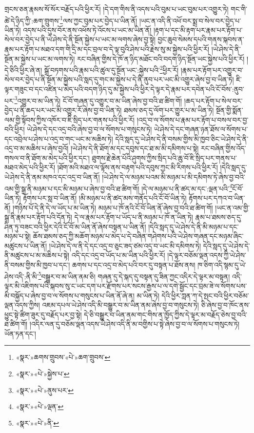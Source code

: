 གྲངས་ཅན་རྣམས་སོ་སོར་བརྗོད་པའི་ཕྱིར་རོ། །དེ་དག་གིས་ནི་འདས་པའི་བུམ་པ་ཡང་བུམ་པར་འགྱུར་ཏེ། གང་གི་ཚེ་དེ་ཉིད་ཀྱི་:ཆག་གྲུགས་\footnote{«སྣར་»ཆགས་གྲུབས་«པེ་»ཆག་གྲུབས་}ལས་ཀྱང་བུམ་པར་བྱེད་པ་ཡིན་ནོ། །ཡང་ན་འདི་ནི་འཕོ་བར་སྨྲ་བ་སེལ་བར་བྱེད་པ་ཡིན་ཏེ། འདས་པའི་དུས་བོར་ནས་འཕོས་ཏེ་འོངས་པ་ཡང་མ་ཡིན་ནོ། །རྟག་པ་དང་མི་རྟག་པར་རྣམ་པར་རྟོག་པ་སེལ་བར་བྱེད་པ་ནི་ཡེ་ཤེས་དེ་ནི་སྔོན་སྐྱེས་པ་ཡང་མ་ལགས་ཞེས་བྱ་སྟེ། བྱང་ཆུབ་སེམས་དཔའི་གནས་སྐབས་ན་རྣམ་པར་རྟོག་པ་མཐའ་དག་གི་དྲི་མ་དང་བྲལ་བ་དེ་ལྟ་བུའི་ཤེས་པའི་རྗེས་སུ་མ་སྐྱེས་པའི་ཕྱིར་རོ། །ཡེ་ཤེས་དེ་ནི་སྔོན་མ་སྐྱེས་པ་ཡང་མ་ལགས་ཏེ། རང་བཞིན་གྱིས་དེ་ཁོ་ན་ཉིད་མཐོང་བའི་བདག་ཉིད་སྔོན་ཡང་སྐྱེས་པའི་ཕྱིར་རོ། །དེ་ཅིའི་ཕྱིར་ཞེ་ན། སྒྲོ་བཏགས་པའི་རྣམ་པའི་ཚུལ་དུ་སྔོན་ཡང་:སྐྱེས་པའི་\footnote{«སྣར་»«པེ་»སྐྱེས་པ་}ཕྱིར་རོ། །རྣམ་པར་རྟོག་པར་འགྱུར་བ་སེལ་བར་བྱེད་པ་ནི་སྔོན་མ་སྐྱེས་པའི་སླད་དུ་གང་མ་སྐྱེས་པ་དེ་ནི་ནུབ་པར་ཡང་མི་འགྱུར་ཞེས་བྱ་བ་ཡིན་ཏེ། ཇི་ལྟར་གཟུང་བ་དང་འཛིན་པ་མེད་པའི་བདག་ཉིད་དུ་མ་སྐྱེས་པའི་ཕྱིར་དེ་ལྟར་དེ་རྣམ་པར་དབེན་པའི་ངོ་བོས་:ནུབ་པར་\footnote{«སྣར་»«པེ་»ནུས་པར་}འགྱུར་བ་མ་ཡིན་ཏེ། ངོ་བོ་གཞན་དུ་འགྱུར་བ་མ་ཡིན་ཞེས་བྱ་བའི་ཐ་ཚིག་གོ། །ཆད་པར་རྟོག་པ་སེལ་བར་བྱེད་པ་ནི་ཆད་པར་ཡང་མི་འགྱུར་རོ་ཞེས་བྱ་བ་ཡིན་ཏེ། ཐམས་ཅད་དུ་ལོག་པར་གྱུར་པ་མ་ཡིན་ཏེ། སྔོན་གྱི་སྨོན་ལམ་གྱི་སྟོབས་ཀྱིས་འཁོར་བ་ཇི་སྲིད་པར་གནས་པའི་ཕྱིར་རོ། །འདྲ་བ་ལ་སོགས་པ་རྣམ་པར་རྟོག་པ་བསལ་བར་བྱ་བའི་ཕྱིར། ཡེ་ཤེས་དེ་དང་འདྲ་བའི་ཞེས་བྱ་བ་ལ་སོགས་པ་གསུངས་ཏེ། ཡེ་ཤེས་དེ་དང་གཞན་ཉན་ཐོས་ལ་སོགས་པ་དང་འབྲེལ་པ་ཤེས་པ་འདྲ་བ་གང་ཡང་མ་མཆིས་ཏེ། དེའི་སླད་དུ་ཡེ་ཤེས་དེ་ནི་བསམ་གྱིས་མི་ཁྱབ་ཅིང་ཡེ་ཤེས་དེ་ནི་འདྲ་བ་མ་མཆིས་པ་ཞེས་བྱའོ། །ཡེ་ཤེས་དེ་ནི་ཐོག་མ་དང་དབུས་དང་ཐ་མ་མི་དམིགས་པ་སྟེ། རང་བཞིན་གྱིས་འོད་གསལ་བ་ནི་ཐོག་མ་མེད་པའི་ཕྱིར་དང་། ཐུགས་རྗེ་ཆེན་པོའི་ཤུགས་ཀྱིས་སྲིད་པའི་ཆུ་བོ་ཇི་སྲིད་པར་གནས་པ་མཐའ་མེད་པའི་ཕྱིར་རོ། །ཐོག་མའི་མཐའ་ལ་ལྟོས་ནས་བརྟག་པའི་དབུས་ཀྱང་མི་རིགས་པའི་ཕྱིར་རོ། །དེའི་སླད་དུ་ཡེ་ཤེས་དེ་ནི་ནམ་མཁའ་དང་འདྲ་བ་ཡིན་ནོ། །ཡེ་ཤེས་དེ་ལ་མཉམ་པའམ་མི་མཉམ་པ་མི་དམིགས་ཏེ་ཞེས་བྱ་བའི་འམ་གྱི་སྒྲ་ནི་མཉམ་པ་དང་མི་མཉམ་པ་ཞེས་བྱ་བའི་ཐ་ཚིག་གོ། །དེ་ལ་མཉམ་པ་ནི་ཚད་མ་དང་:ལྡན་པའི་\footnote{«སྣར་»«པེ་»ལྡན་}ངོ་བོ་ཡིན་ཏེ། རྟོགས་པར་སླ་བ་ཡིན་ནོ། །མི་མཉམ་པ་ནི་ཚད་མས་གནོད་པའི་ངོ་བོ་ཡིན་ཏེ། རྟོགས་པར་དཀའ་བ་ཡིན་ནོ། །གཉིས་པོ་དེ་ནི་དེ་ལ་ཡོད་པ་མ་ཡིན་ཏེ། མཉམ་པ་ཁོ་ནའི་ངོ་བོ་ཡིན་ནོ་ཞེས་བྱ་བའི་ཐ་ཚིག་གོ། །ཡང་ན་འམ་གྱི་སྒྲ་ནི་རྣམ་པར་རྟོག་པའི་དོན་ཏེ། དེ་ལ་རྣམ་པར་རྟོག་པ་ཡོད་པ་ནི་མཉམ་པ་ཁོ་ན་ཡིན་ཏེ། རྣམ་པ་ཐམས་ཅད་དུ་ཤིན་ཏུ་བཟང་བའི་ཕྱིར་དེའི་ངོ་བོ་མ་ཡིན་ནོ་ཞེས་བསྟན་པ་ཡིན་ནོ། །དེའི་སླད་དུ་ཡེ་ཤེས་དེ་ནི་མི་མཉམ་པ་དང་མཉམ་པ་སྟེ། ཆོས་ཐམས་ཅད་ཀྱི་མཆོག་མཉམ་པ་མེད་པ་དེ་བཞིན་གཤེགས་པའི་ཡེ་ཤེས་གཞན་དང་མཉམ་ཞིང་མཚུངས་པ་ཡིན་ནོ། །ཡེ་ཤེས་དེ་ལ་ནི་དེ་དང་འདྲ་བ་ཅུང་ཟད་ཙམ་འདྲ་བ་ཡང་མི་དམིགས་ཏེ། དེའི་སླད་དུ་ཡེ་ཤེས་དེ་ནི་མཚུངས་པ་མ་མཆིས་པ་སྟེ། འདི་དང་འདྲ་བ་ཡོད་པ་མ་ཡིན་པའི་ཕྱིར་རོ། །དེ་ལྟར་བཅོམ་ལྡན་འདས་ཀྱི་ཡེ་ཤེས་ནི་བསམ་གྱིས་མི་ཁྱབ་པ་དང་། ཆགས་པ་དང་འདྲ་བ་མེད་པའི་བར་དུ་བསྟན་པ་ཐོས་ནས། ཁ་ཅིག་འདི་སྙམ་དུ་ཡེ་ཤེས་འདི་:ནི་མི་\footnote{«སྣར་»«པེ་»ནི་}བསྒྱུར་བ་མ་ཡིན་ནམ་ཅི། གཞན་དུ་དེ་སྐད་དུ་བསྟན་དུ་ཟིན་ཀྱང་འདིར་དེ་ལྟར་མ་བསྟན། འདི་ལྟར་མི་འཇིགས་པའི་སྐབས་སུ་ང་ཡང་དག་པར་རྫོགས་པར་སངས་རྒྱས་པ་ལ་དགེ་སྦྱོང་དང་བྲམ་ཟེ་ལ་སོགས་པས་མི་བསྐྱོད་པ་ཞེས་བྱ་བ་ལ་སོགས་པ་གསུངས་པ་ཡིན་ནོ་ཞེ་ན། མ་ཡིན་ཏེ། དེའི་ཕྱིར་ཀླན་ཀ་དེ་སྤང་བའི་ཕྱིར་བཅོམ་ལྡན་འདས་ཀྱིས། འཇམ་དཔལ་ཡེ་ཤེས་འདི་མི་བསྒྱུར་བ་མ་ཡིན་ནམ་ཞེས་བྱ་བ་གསུངས་ཏེ། ཅི་ཞེས་བྱ་བ་ཁོང་ནས་ཕྱུང་སྟེ་ཚིག་ཟུར་དུ་བརྗོད་པར་བྱ་སྟེ། དེ་ཅི་བསྒྱུར་བ་ཡིན་ནམ་གང་གིས་ན་ཁྱོད་ཀྱིས་དེ་ལྟར་མ་བརྗོད་ཅེས་བྱ་བའི་ཐ་ཚིག་གོ། །འདིར་ལན་དུ་བཅོམ་ལྡན་འདས་ཡེ་ཤེས་འདི་ནི་མ་བགྱིས་པ་སྟེ་ཞེས་བྱ་བ་ལ་སོགས་པ་གསུངས་ཏེ། ཡོན་ཏན་དང་། 